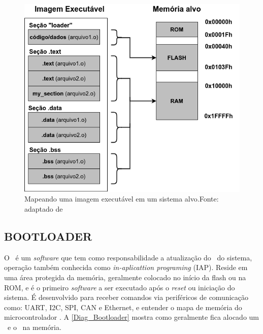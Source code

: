 \begin{figure}[H]
    \scriptsize
     \centering
     \includegraphics[scale=0.7]{dados/figuras/Linker4.png}
     \caption{Mapeando uma imagem executável em um sistema alvo.\newline Fonte: adaptado de \cite{Qing2003}}
     \label{linker4}
\end{figure}






\subsection{BOOTLOADER}

O \bootloader\ é um \textit{software} que tem como responsabilidade a atualização do \firmware\ do sistema, operação também conhecida como \textit{in-aplicattion programing} (IAP). Reside em uma área protegida da memória, geralmente colocado no início da flash ou na ROM, e é o primeiro \textit{software} a ser executado após o \textit{reset} ou iniciação do sistema.
É desenvolvido para receber comandos via periféricos de comunicação como: UART, I2C, SPI, CAN e Ethernet, e entender o mapa de memória do microcontrolador \cite{DavesDurlin2013}. A \autoref{Diag_Bootloader} mostra como geralmente fica alocado um \bootloader\ e o \firmware\ na memória.

